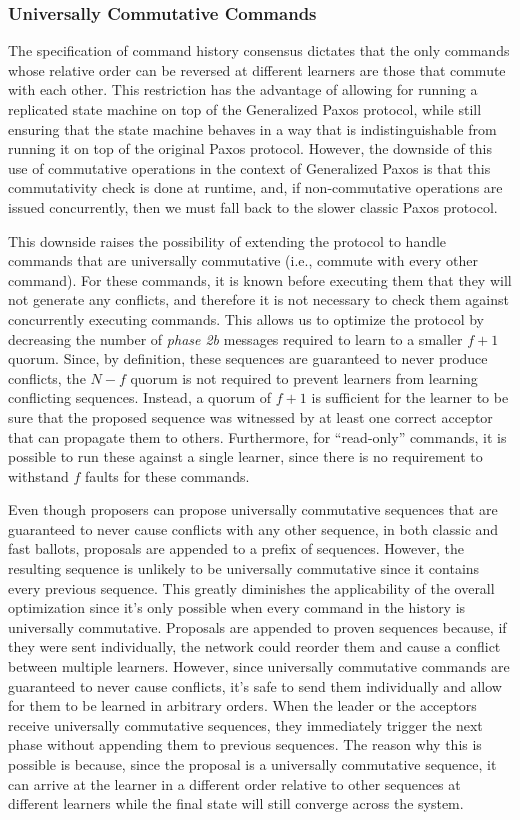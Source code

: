 \subsubsection{Universally Commutative Commands}
The specification of command history consensus dictates that the only commands whose relative order can be reversed at different learners are those that commute with each other. This restriction has the advantage of allowing for running a replicated state machine on top of the Generalized Paxos protocol, while still ensuring that the state machine behaves in a way that is indistinguishable from running it on top of the original Paxos protocol. However, the downside of this use of commutative operations in the context of Generalized Paxos is that this commutativity check is done at runtime, and, if non-commutative operations are issued concurrently, then we must fall back to the slower classic Paxos protocol.\par
This downside raises the possibility of extending the protocol to handle commands that are universally commutative (i.e., commute with every other command). For these commands, it is known before executing them that they will not generate any conflicts, and therefore it is not necessary to check them against concurrently executing commands. This allows us to optimize the protocol by decreasing the number of \textit{phase 2b} messages required to learn to a smaller $f+1$ quorum. Since, by definition, these sequences are guaranteed to never produce conflicts, the $N-f$ quorum is not required to prevent learners from learning conflicting sequences. Instead, a quorum of $f+1$ is sufficient for the learner to be sure that the proposed sequence was witnessed by at least one correct acceptor that can propagate them to others. Furthermore, for ``read-only'' commands, it is possible to run these against a single learner, since there is no requirement to withstand $f$ faults for these commands. \par
Even though proposers can propose universally commutative sequences that are guaranteed to never cause conflicts with any other sequence, in both classic and fast ballots, proposals are appended to a prefix of sequences. However, the resulting sequence is unlikely to be universally commutative since it contains every previous sequence. This greatly diminishes the applicability of the overall optimization since it's only possible when every command in the history is universally commutative. Proposals are appended to proven sequences because, if they were sent individually, the network could reorder them and cause a conflict between multiple learners. However, since universally commutative commands are guaranteed to never cause conflicts, it's safe to send them individually and allow for them to be learned in arbitrary orders. When the leader or the acceptors receive universally commutative sequences, they immediately trigger the next phase without appending them to previous sequences. The reason why this is possible is because, since the proposal is a universally commutative sequence, it can arrive at the learner in a different order relative to other sequences at different learners while the final state will still converge across the system.\par
